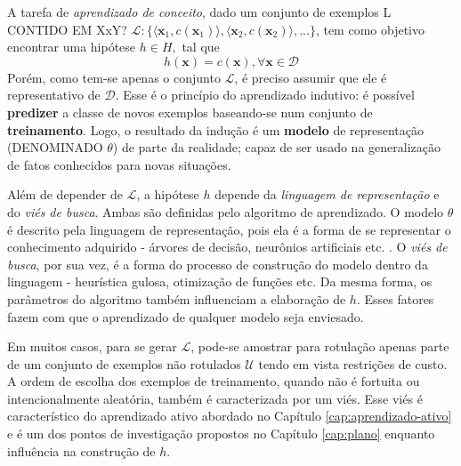 A tarefa de \textit{aprendizado de conceito}, dado um conjunto de exemplos L CONTIDO EM XxY? $\mathcal{L}:\{\langle \bm{x}_1, c(\bm{x}_1) \rangle, \langle \bm{x}_2, c(\bm{x}_2) \rangle, ... \}$, tem como objetivo encontrar uma hipótese $h \in H,$ tal que
\begin{equation}
 h(\bm{x}) = c(\bm{x}), \forall \bm{x} \in \mathcal{D}
\end{equation}
Porém, como tem-se apenas o conjunto $\mathcal{L}$, é preciso assumir que ele é representativo de $\mathcal{D}$.
Esse é o princípio do aprendizado indutivo: é possível \textbf{predizer} a classe de novos exemplos baseando-se num conjunto de \textbf{treinamento}.
Logo, o resultado da indução é um \textbf{modelo} de representação (DENOMINADO $\theta$) de parte da realidade; capaz de ser usado na generalização de fatos conhecidos para novas situações.

Além de depender de $\mathcal{L}$, a hipótese $h$ depende da \textit{linguagem de representação} e
do \textit{viés de busca}.
Ambas são definidas pelo algoritmo de aprendizado.
O modelo $\theta$ é descrito pela linguagem de representação,
pois ela é a forma de se representar o conhecimento adquirido -
árvores de decisão, neurônios artificiais etc. \citep{quinlan1993c4,haykin1994neural}.
O \textit{viés de busca}, por sua vez, é a forma do processo de construção do modelo dentro da linguagem -
heurística gulosa, otimização de funções etc.
Da mesma forma, os parâmetros do algoritmo também influenciam a elaboração de $h$.
Esses fatores fazem com que o aprendizado de qualquer modelo seja enviesado.

Em muitos casos, para se gerar $\mathcal{L}$, pode-se amostrar para rotulação apenas
parte de um conjunto de exemplos não rotulados $\mathcal{U}$ tendo em vista
restrições de custo.
A ordem de escolha dos exemplos de treinamento, quando não é fortuita ou
intencionalmente aleatória, também é caracterizada por um viés.
Esse viés é característico do aprendizado ativo abordado no
Capítulo \ref{cap:aprendizado-ativo} e é um dos pontos de investigação propostos
no Capítulo \ref{cap:plano} enquanto influência na construção de $h$.


%
%

